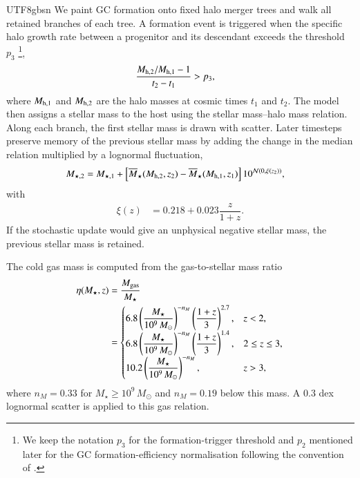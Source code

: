 \documentclass[trackchanges, twocolappendix, twocolumn]{aastex701}
\begin{document}
\begin{CJK*}{UTF8}{gbsn}
We paint GC formation onto fixed halo merger trees and walk all retained branches of each tree. A formation event is triggered when the specific halo growth rate between a progenitor and its descendant exceeds the threshold $p_3$ \footnote{We keep the notation $p_3$ for the formation-trigger threshold and $p_2$ mentioned later for the GC formation-efficiency normalisation following the convention of \cite{Muratov&Gnedin2010GC}.},
\begin{align}
\dfrac{M_{{\rm h}, 2} / M_{{\rm h}, 1} - 1}{t_2 - t_1} & > p_3 ,
\label{eq:formation_trigger}
\end{align}
where $M_{{\rm h}, 1}$ and $M_{{\rm h}, 2}$ are the halo masses at cosmic times $t_1$ and $t_2$. The model then assigns a stellar mass to the host using the \cite{Behroozi+2013SMHM} stellar mass--halo mass relation. Along each branch, the first stellar mass is drawn with scatter. Later timesteps preserve memory of the previous stellar mass by adding the change in the median relation multiplied by a lognormal fluctuation,
\begin{align}
M_{\star,2} & =
M_{\star,1}
+ \left[\overline{M}_{\star}(M_{{\rm h},2}, z_2)
- \overline{M}_{\star}(M_{{\rm h},1}, z_1)\right]
10^{\mathcal{N}(0, \xi(z_2))} ,
\end{align}
with
\begin{align}
\xi(z) & = 0.218 + 0.023 \dfrac{z}{1 + z}.
\end{align}
If the stochastic update would give an unphysical negative stellar mass, the previous stellar mass is retained.

The cold gas mass is computed from the gas-to-stellar mass ratio
\begin{align}
\eta(M_{\star}, z) & = \dfrac{M_{\rm gas}}{M_{\star}} \notag \\
& = \begin{cases}
6.8\left(\dfrac{M_{\star}}{10^9\,M_\odot}\right)^{-n_M}
\left(\dfrac{1 + z}{3}\right)^{2.7}, & z < 2,\\
6.8\left(\dfrac{M_{\star}}{10^9\,M_\odot}\right)^{-n_M}
\left(\dfrac{1 + z}{3}\right)^{1.4}, & 2 \le z \le 3,\\
10.2\left(\dfrac{M_{\star}}{10^9\,M_\odot}\right)^{-n_M}, & z > 3,
\end{cases}
\label{eq:gas_fraction}
\end{align}
where $n_M = 0.33$ for $M_{\star} \ge 10^9\,M_\odot$ and $n_M = 0.19$ below this mass. A 0.3 dex lognormal scatter is applied to this gas relation.


\end{CJK*}
\end{document}
